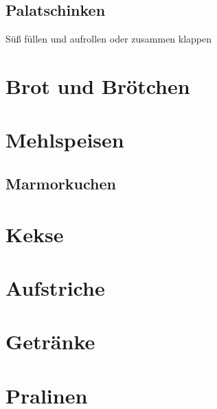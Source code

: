 \documentclass[ngerman,11pt,parskip=half,a5paper,twoside]{scrbook}
\begin{document}

\clearpage

	\section{Palatschinken} 
	 
	Süß füllen und aufrollen oder zusammen klappen
	\clearpage

\chapter{Brot und Brötchen}

\clearpage

\chapter{Mehlspeisen}

\clearpage

	\section{Marmorkuchen} 
	 
	\clearpage
	
\chapter{Kekse}

\clearpage

\chapter{Aufstriche}

\clearpage

\chapter{Getränke}

\clearpage

\chapter{Pralinen}

\clearpage

	
\end{document}
